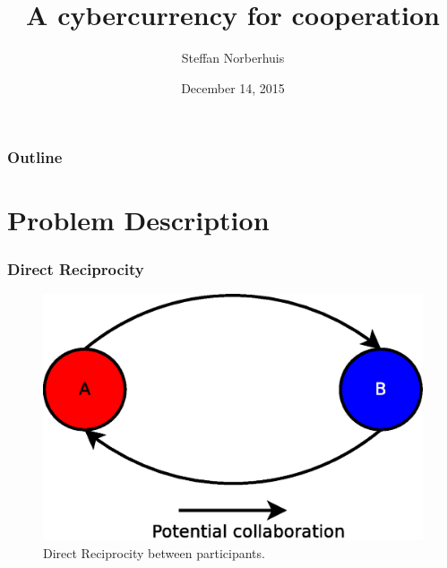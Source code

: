 \documentclass{beamer}
\title[MultiChain]{A cybercurrency for cooperation}
\institute[TU Delft]{Delft University of Technology}
\author{Steffan Norberhuis}
\date{December 14, 2015}
\newcommand*\titleTOC{Outline}
\begin{document}

{
%
\frame{\titlepage}
}

{
\begin{frame}\frametitle{\titleTOC}
	\tableofcontents
\end{frame}
}

\section{Problem Description}
\begin{frame}
\frametitle{Direct Reciprocity}
\begin{figure}
	\centerline{\includegraphics[scale=0.3]{images/problem/direct-reciprocity.eps}}
	\caption{Direct Reciprocity between participants.}
	\label{fig:direct-reciprocity}
\end{figure}
\end{frame}
\end{document}
